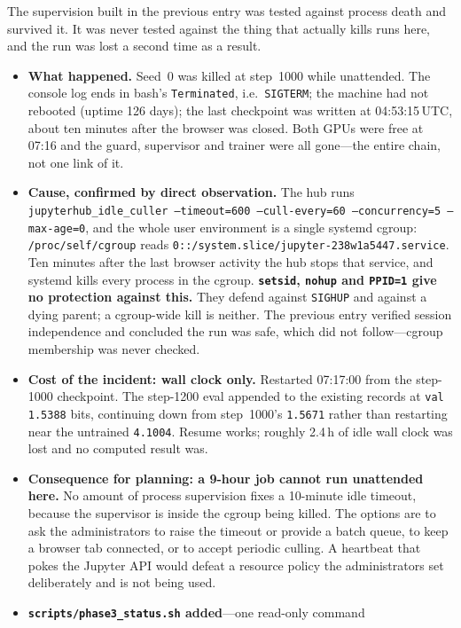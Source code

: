 \documentclass[11pt,a4paper]{article}
\newcommand{\code}[1]{\texttt{\small #1}}
\newcommand{\warn}[1]{\textcolor{warncol}{\textbf{#1}}}
\begin{document}
The supervision built in the previous entry was tested against process death and
survived it. It was never tested against the thing that actually kills runs
here, and the run was lost a second time as a result.

\begin{itemize}
\item \warn{What happened.} Seed~0 was killed at step~1000 while unattended. The
console log ends in bash's \code{Terminated}, i.e.\ \code{SIGTERM}; the machine
had not rebooted (uptime 126 days); the last checkpoint was written at
04:53:15\,UTC, about ten minutes after the browser was closed. Both GPUs were
free at 07:16 and the guard, supervisor and trainer were all gone---the entire
chain, not one link of it.
\item \warn{Cause, confirmed by direct observation.} The hub runs
\code{jupyterhub\_idle\_culler --timeout=600 --cull-every=60 --concurrency=5
--max-age=0}, and the whole user environment is a single systemd cgroup:
\code{/proc/self/cgroup} reads
\code{0::/system.slice/jupyter-238w1a5447.service}. Ten minutes after the last
browser activity the hub stops that service, and systemd kills every process in
the cgroup. \textbf{\code{setsid}, \code{nohup} and \code{PPID=1} give no
protection against this.} They defend against \code{SIGHUP} and against a dying
parent; a cgroup-wide kill is neither. The previous entry verified session
independence and concluded the run was safe, which did not follow---cgroup
membership was never checked.
\item \textbf{Cost of the incident: wall clock only.} Restarted 07:17:00 from
the step-1000 checkpoint. The step-1200 eval appended to the existing records
at \code{val 1.5388} bits, continuing down from step~1000's \code{1.5671}
rather than restarting near the untrained \code{4.1004}. Resume works; roughly
2.4\,h of idle wall clock was lost and no computed result was.
\item \textbf{Consequence for planning: a 9-hour job cannot run unattended
here.} No amount of process supervision fixes a 10-minute idle timeout, because
the supervisor is inside the cgroup being killed. The options are to ask the
administrators to raise the timeout or provide a batch queue, to keep a browser
tab connected, or to accept periodic culling. A heartbeat that pokes the Jupyter
API would defeat a resource policy the administrators set deliberately and is
not being used.
\item \textbf{\code{scripts/phase3\_status.sh} added}---one read-only command

\end{itemize}
\end{document}
